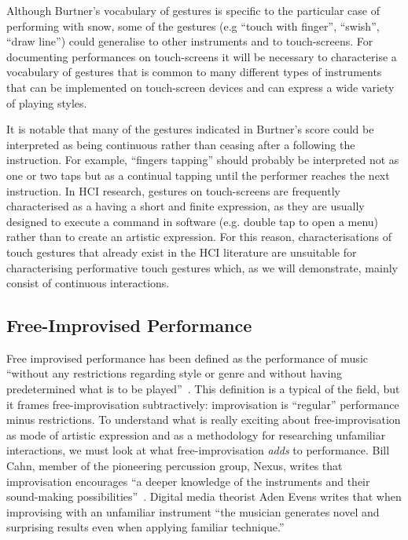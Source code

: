 \documentclass[graybox]{svmult}
\begin{document}
Although Burtner's vocabulary of gestures is specific to the
particular case of performing with snow, some of the gestures (e.g
``touch with finger'', ``swish'', ``draw line'') could generalise to
other instruments and to touch-screens. For documenting performances
on touch-screens it will be necessary to characterise a vocabulary of
gestures that is common to many different types of instruments that
can be implemented on touch-screen devices and can express a wide
variety of playing styles.

It is notable that many of the gestures indicated in Burtner's score
could be interpreted as being continuous rather than ceasing after a
following the instruction. For example, ``fingers tapping'' should
probably be interpreted not as one or two taps but as a continual
tapping until the performer reaches the next instruction. In HCI
research, gestures on touch-screens are frequently characterised as a
having a short and finite expression, as they are usually designed to
execute a command in software (e.g. double tap to open a menu) rather
than to create an artistic expression. For this reason,
characterisations of touch gestures that already exist in the HCI
literature are unsuitable for characterising performative touch
gestures which, as we will demonstrate, mainly consist of continuous
interactions. 

\subsection{Free-Improvised Performance}

Free improvised performance has been defined as the performance of
music ``without any restrictions regarding style or genre and without
having predetermined what is to be played''~\cite{Stenstrom:2009xy}.
This definition is a typical of the field, but it frames
free-improvisation subtractively: improvisation is ``regular''
performance minus restrictions. To understand what is really exciting
about free-improvisation as mode of artistic expression and as a
methodology for researching unfamiliar interactions, we must look at
what free-improvisation \emph{adds} to performance. Bill Cahn, member
of the pioneering percussion group, Nexus, writes that improvisation
encourages ``a deeper knowledge of the instruments and their
sound-making possibilities''~\cite{Cahn:2005uq}. Digital media
theorist Aden Evens writes that when improvising with an unfamiliar
instrument ``the musician generates novel and surprising results even
when applying familiar technique.''~\cite{Evens:2005kx}
\end{document}
